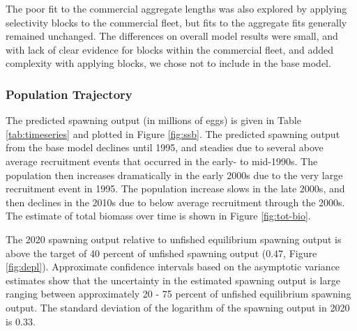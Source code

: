 \documentclass[11pt,
  english,
  a4paper,
]{article}
\begin{document}
\leavevmode\tagmcend\tagstructend\par


The poor fit to the commercial aggregate lengths was also explored by applying selectivity blocks to the commercial fleet, but fits to the aggregate fits generally remained unchanged. The differences on overall model results were small, and with lack of clear evidence for blocks within the commercial fleet, and added complexity with applying blocks, we chose not to include in the base model.

\leavevmode\tagmcend\tagstructend\par


\hypertarget{population-trajectory}{%
\subsubsection{Population Trajectory}\label{population-trajectory}}

\leavevmode\tagmcend\tagstructend


The predicted spawning output (in millions of eggs) is given in Table \ref{tab:timeseries} and plotted in Figure \ref{fig:ssb}. The predicted spawning output from the base model declines until 1995, and steadies due to several above average recruitment events that occurred in the early- to mid-1990s. The population then increases dramatically in the early 2000s due to the very large recruitment event in 1995. The population increase slows in the late 2000s, and then declines in the 2010s due to below average recruitment through the 2000s. The estimate of total biomass over time is shown in Figure \ref{fig:tot-bio}.

\leavevmode\tagmcend\tagstructend\par


The 2020 spawning output relative to unfished equilibrium spawning output is above the target of 40 percent of unfished spawning output (0.47, Figure \ref{fig:depl}). Approximate confidence intervals based on the asymptotic variance estimates show that the uncertainty in the estimated spawning output is large ranging between approximately 20 - 75 percent of unfished equilibrium spawning output. The standard deviation of the logarithm of the spawning output in 2020 is 0.33.
\end{document}
